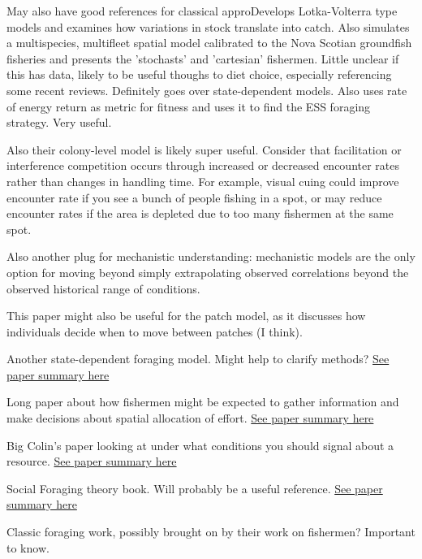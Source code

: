 \documentclass[a4paper,10pt]{report}
\begin{document}
\begin{description}
May also have good references for classical approDevelops Lotka-Volterra type models and examines how variations in stock translate into catch.
Also simulates a multispecies, multifleet spatial model calibrated to the Nova Scotian groundfish fisheries and presents the 'stochasts' and 'cartesian' fishermen.
Little unclear if this has data, likely to be useful thoughs to diet choice, especially referencing some recent reviews. Definitely goes over state-dependent models. Also uses rate of energy return as metric for fitness and uses it to find the ESS foraging strategy. Very useful. 

Also their colony-level model is likely super useful. Consider that facilitation or interference competition occurs through increased or decreased encounter rates rather than changes in handling time. For example, visual cuing could improve encounter rate if you see a bunch of people fishing in a spot, or may reduce encounter rates if the area is depleted due to too many fishermen at the same spot. 

Also another plug for mechanistic understanding: mechanistic models are the only option for moving beyond simply extrapolating observed correlations beyond the observed historical range of conditions. 

This paper might also be useful for the patch model, as it discusses how individuals decide when to move between patches (I think). 
\item[\cite{Wiedenmannetal:2011}] Another state-dependent foraging model. Might help to clarify methods?  \href{run:/Source_Summaries/Wiedenmann_etal_2011.tex}{\color{cyan}See paper summary here}
\item[\cite{MangelPlant:1985}] Long paper about how fishermen might be expected to gather information and make decisions about spatial allocation of effort. \href{run:/Source_Summaries/MangelPlant_1985.tex}{\color{cyan}See paper summary here}
\item[\cite{Torneyetal:2011}] Big Colin's paper looking at under what conditions you should signal about a resource. \href{run:/Source_Summaries/Torney_et_al_2011.tex}{\color{cyan}See paper summary here}

\item[\cite{GiraldeauCaraco:2000}] Social Foraging theory book. Will probably be a useful reference. \href{run:/Source_Summaries/Social_Foraging_Theory.tex}{\color{cyan}See paper summary here}
\item[\cite{ClarkMangel:1984}] Classic foraging work, possibly brought on by their work on fishermen? Important to know. 
\end{description}
\end{document}
